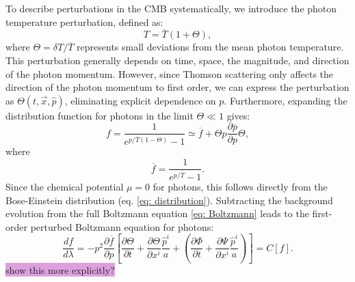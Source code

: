 \documentclass{aa}
\numberwithin{equation}{section}
\numberwithin{table}{section}
\numberwithin{figure}{section}
\begin{document}
To describe perturbations in the CMB systematically, we introduce the photon temperature perturbation, defined as:
\begin{equation}
T = \overline{T} (1 + \Theta),
\end{equation}
where $\Theta = \delta T/\overline{T}$ represents small deviations from the mean photon temperature. This perturbation generally depends on time, space, the magnitude, and direction of the photon momentum. However, since Thomson scattering only affects the direction of the photon momentum to first order, we can express the perturbation as $\Theta(t, \vec{x}, \hat{p})$, eliminating explicit dependence on $p$. Furthermore, expanding the distribution function for photons in the limit $\Theta \ll 1$ gives:
\begin{equation}
f = \frac{1}{e^{p/\overline{T}(1-\Theta)}-1} \simeq \overline{f} + \Theta p\frac{\partial\overline{p}}{\partial p} \Theta,
\end{equation}
where 
\begin{equation}
  \overline{f} = \frac{1}{e^{p/\overline{T}}-1}.
\end{equation}
Since the chemical potential $\mu=0$ for photons, this follows directly from the Bose-Einstein distribution (eq. \eqref{eq: distribution}). Subtracting the background evolution from the full Boltzmann equation \eqref{eq: Boltzmann} leads to the first-order perturbed Boltzmann equation for photons:
\begin{equation}
\frac{df}{d\lambda} = -p^2\frac{\partial\overline{f}}{\partial p}\left[\frac{\partial{\Theta}}{\partial t} + \frac{\partial{\Theta}}{\partial x^{i}}\frac{\hat{p}^{i}}{a} + \left(\frac{\partial{\Phi}}{\partial t} + \frac{\partial{\Psi}}{\partial x^{i}}\frac{\hat{p}^{i}}{a} \right) \right] = C[f]. \label{eq: Boltzmann photons}
\end{equation}
\colorbox{Plum}{show this more explicitly?} 
\end{document}
